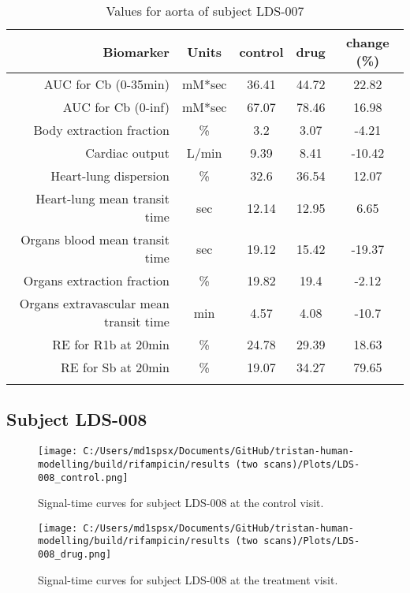 \documentclass{epflreport}%
\begin{document}
\begin{longtable}{rcccc}%
\hline%
Biomarker&Units&control&drug&change (\%)\\%
\hline%
AUC for Cb (0{-}35min)&mM*sec&36.41&44.72&22.82\\%
AUC for Cb (0{-}inf)&mM*sec&67.07&78.46&16.98\\%
Body extraction fraction&\%&3.2&3.07&{-}4.21\\%
Cardiac output&L/min&9.39&8.41&{-}10.42\\%
Heart{-}lung dispersion&\%&32.6&36.54&12.07\\%
Heart{-}lung mean transit time&sec&12.14&12.95&6.65\\%
Organs blood mean transit time&sec&19.12&15.42&{-}19.37\\%
Organs extraction fraction&\%&19.82&19.4&{-}2.12\\%
Organs extravascular mean transit time&min&4.57&4.08&{-}10.7\\%
RE for R1b at 20min&\%&24.78&29.39&18.63\\%
RE for Sb at 20min&\%&19.07&34.27&79.65\\%
\hline%
\caption{Values for aorta of subject LDS-007} \\%
\end{longtable}%
\clearpage%
\subsection{Subject LDS{-}008}%
\label{subsec:SubjectLDS{-}008}%

%


\begin{figure}[h!]%
\centering%
\texttt{[image: C:/Users/md1spsx/Documents/GitHub/tristan-human-modelling/build/rifampicin/results (two scans)/Plots/LDS-008\_control.png]}%
\caption{Signal{-}time curves for subject LDS{-}008 at the control visit.}%
\end{figure}

%


\begin{figure}[h!]%
\centering%
\texttt{[image: C:/Users/md1spsx/Documents/GitHub/tristan-human-modelling/build/rifampicin/results (two scans)/Plots/LDS-008\_drug.png]}%
\caption{Signal{-}time curves for subject LDS{-}008 at the treatment visit.}%
\end{figure}
\end{document}
